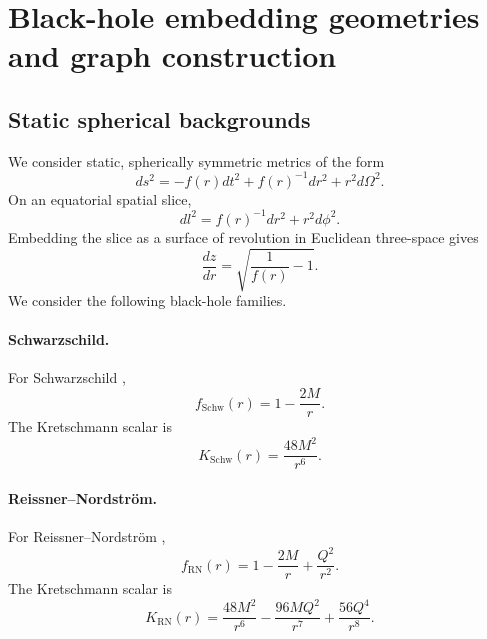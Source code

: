 \documentclass[11pt,a4paper]{article}
\begin{document}
\section{Black-hole embedding geometries and graph construction}
\label{sec:geometries}

\subsection{Static spherical backgrounds}

We consider static, spherically symmetric metrics of the form
\begin{equation}
    ds^2
    =
    -f(r)dt^2
    +
    f(r)^{-1}dr^2
    +
    r^2d\Omega^2.
\end{equation}
On an equatorial spatial slice,
\begin{equation}
    dl^2=f(r)^{-1}dr^2+r^2d\phi^2.
\end{equation}
Embedding the slice as a surface of revolution in Euclidean three-space gives
\begin{equation}
    \frac{dz}{dr}=\sqrt{\frac{1}{f(r)}-1}.
    \label{eq:embedding}
\end{equation}
We consider the following black-hole families.

\paragraph{Schwarzschild.}
For Schwarzschild \cite{Schwarzschild1916,Flamm1916},
\begin{equation}
    f_{\mathrm{Schw}}(r)
    =
    1-\frac{2M}{r}.
\end{equation}
The Kretschmann scalar is
\begin{equation}
    K_{\mathrm{Schw}}(r)
    =
    \frac{48M^2}{r^6}.
\end{equation}

\paragraph{Reissner--Nordstr\"om.}
For Reissner--Nordstr\"om \cite{Reissner1916,Nordstrom1918},
\begin{equation}
    f_{\mathrm{RN}}(r)
    =
    1-\frac{2M}{r}
    +
    \frac{Q^2}{r^2}.
\end{equation}
The Kretschmann scalar is
\begin{equation}
    K_{\mathrm{RN}}(r)
    =
    \frac{48M^2}{r^6}
    -
    \frac{96MQ^2}{r^7}
    +
    \frac{56Q^4}{r^8}.
    \label{eq:rnK}
\end{equation}
\end{document}

